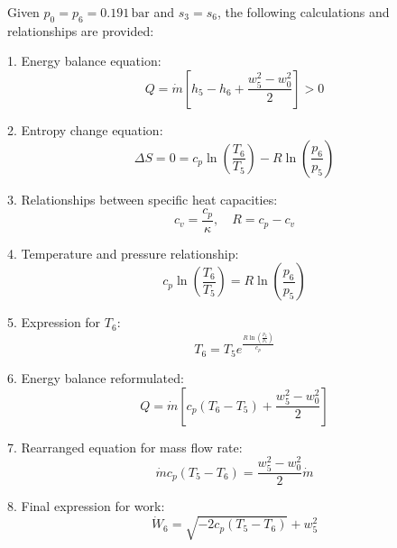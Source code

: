 Given \(p_0 = p_6 = 0.191 \, \text{bar}\) and \(s_3 = s_6\), the following calculations and relationships are provided:  

1. Energy balance equation:  
\[
Q = \dot{m} \left[ h_5 - h_6 + \frac{w_5^2 - w_0^2}{2} \right] > 0
\]

2. Entropy change equation:  
\[
\Delta S = 0 = c_p \ln \left( \frac{T_6}{T_5} \right) - R \ln \left( \frac{p_6}{p_5} \right)
\]

3. Relationships between specific heat capacities:  
\[
c_v = \frac{c_p}{\kappa}, \quad R = c_p - c_v
\]

4. Temperature and pressure relationship:  
\[
c_p \ln \left( \frac{T_6}{T_5} \right) = R \ln \left( \frac{p_6}{p_5} \right)
\]

5. Expression for \(T_6\):  
\[
T_6 = T_5 e^{\frac{R \ln \left( \frac{p_6}{p_5} \right)}{c_p}}
\]

6. Energy balance reformulated:  
\[
Q = \dot{m} \left[ c_p (T_6 - T_5) + \frac{w_5^2 - w_0^2}{2} \right]
\]

7. Rearranged equation for mass flow rate:  
\[
\dot{m} c_p (T_5 - T_6) = \frac{w_5^2 - w_0^2}{2} \dot{m}
\]

8. Final expression for work:  
\[
\dot{W}_6 = \sqrt{-2 c_p (T_5 - T_6)} + w_5^2
\]